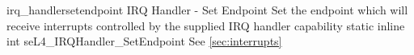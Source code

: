 %
%
%
%

\apidoc
{irq_handlersetendpoint}
{IRQ Handler - Set Endpoint}
{Set the endpoint which will receive interrupts controlled by the supplied IRQ
handler capability}
{static inline int seL4\_IRQHandler\_SetEndpoint}
{
}
{\errorenumdesc}
{See \autoref{sec:interrupts}}
